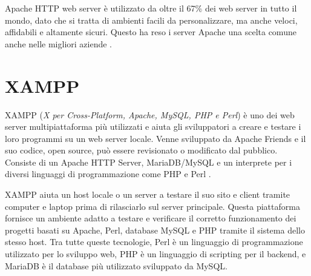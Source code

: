 Apache HTTP web server è utilizzato da oltre il 67\% dei web server in tutto il mondo, dato che si tratta di ambienti facili da personalizzare, ma anche veloci, affidabili e altamente sicuri. Questo ha reso i server Apache una scelta comune anche nelle migliori aziende \cite{Apache}.

\section{XAMPP}
XAMPP (\textit{X per Cross-Platform, Apache, MySQL, PHP e Perl}) è uno dei web server multipiattaforma più utilizzati e aiuta gli sviluppatori a creare e testare i loro programmi su un web server locale. Venne sviluppato da Apache Friends e il suo codice, open source, può essere revisionato o modificato dal pubblico. Consiste di un Apache HTTP Server, MariaDB/MySQL e un interprete per i diversi linguaggi di programmazione come PHP e Perl \cite{XAMPP, XAMPP_Docs}.

XAMPP aiuta un host locale o un server a testare il suo sito e client tramite computer e laptop prima di rilasciarlo sul server principale. Questa piattaforma fornisce un ambiente adatto a testare e verificare il corretto funzionamento dei progetti basati su Apache, Perl, database MySQL e PHP tramite il sistema dello stesso host. Tra tutte queste tecnologie, Perl è un linguaggio di programmazione utilizzato per lo sviluppo web, PHP è un linguaggio di scripting per il backend, e MariaDB è il database più utilizzato sviluppato da MySQL.

